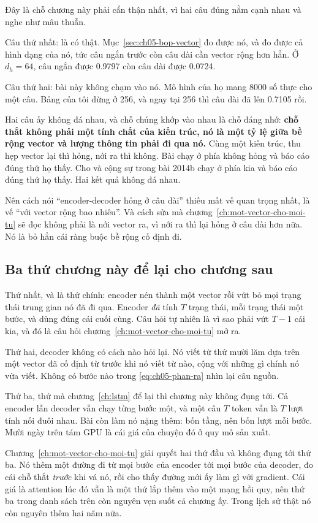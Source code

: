 %
Đây là chỗ chương này phải cẩn thận nhất, vì hai câu đúng nằm cạnh nhau và
nghe như mâu thuẫn.

Câu thứ nhất:  là có thật.
Mục~\ref{sec:ch05-bop-vector} đo được nó, và đo được cả hình dạng của nó, tức
câu ngắn  trước còn câu dài cần vector rộng hơn hẳn. Ở
\(d_h = 64\), câu
ngắn được 0.9797 còn câu dài được 0.0724.

Câu thứ hai: bài này không chạm vào nó. Mô hình của họ mang 8000 số thực cho một
câu. Bảng của tôi dừng ở 256, và ngay tại 256 thì câu dài đã lên 0.7105 rồi.

Hai câu ấy không đá nhau, và chỗ chúng khớp vào nhau là chỗ đáng nhớ:
\textbf{chỗ thắt không phải một tính chất của kiến trúc, nó là một tỷ lệ giữa bề
rộng vector và lượng thông tin phải đi qua nó.} Cùng một kiến trúc, thu hẹp
vector lại thì hỏng, nới ra thì không.
Bài chạy ở phía không hỏng và báo cáo đúng thứ họ thấy. Cho và cộng sự trong bài
2014b chạy ở phía kia và báo cáo đúng thứ họ thấy. Hai kết quả không đá nhau.

Nên cách nói \enquote{encoder-decoder hỏng ở câu dài} thiếu mất vế quan trọng
nhất, là vế \enquote{với vector rộng bao nhiêu}. Và cách sửa mà
chương~\ref{ch:mot-vector-cho-moi-tu} sẽ đọc không phải là nới vector ra, vì
nới ra thì lại hỏng ở câu dài hơn nữa. Nó là bỏ hẳn cái ràng buộc bề rộng cố
định đi.

\subsection*{Ba thứ chương này để lại cho chương sau}

%
Thứ nhất, và là thứ chính: encoder nén  thành
một vector rồi vứt bỏ
mọi trạng thái trung gian nó đã đi qua. Encoder \emph{đã} tính \(T\) trạng thái,
mỗi trạng thái một bước, và dùng đúng cái cuối cùng. Câu hỏi tự nhiên là vì sao
phải vứt \(T - 1\) cái kia, và đó là câu hỏi
chương~\ref{ch:mot-vector-cho-moi-tu} mở ra.

Thứ hai, decoder không có cách nào hỏi lại. Nó viết từ thứ mười lăm dựa trên một
vector đã cố định từ trước khi nó viết từ nào, cộng với những gì chính nó vừa
viết. Không có bước nào trong \eqref{eq:ch05-phan-ra} nhìn lại câu nguồn.

Thứ ba, thứ mà chương~\ref{ch:lstm} để lại thì chương này không đụng tới. Cả
encoder lẫn decoder vẫn chạy từng bước một, và một câu \(T\) token vẫn là \(T\)
lượt tính nối đuôi nhau. Bài còn làm nó nặng thêm: bốn tầng, nên bốn lượt mỗi
bước. Mười ngày trên tám GPU là cái giá của chuyện đó ở quy mô sản xuất.

Chương~\ref{ch:mot-vector-cho-moi-tu} giải quyết hai thứ đầu và không đụng tới
thứ ba. Nó thêm một đường đi từ mọi bước của encoder tới mọi bước của decoder,
đo cái chỗ
thắt \emph{trước} khi vá nó, rồi cho thấy đường mới ấy làm gì với gradient. Cái
giá là attention lúc đó vẫn là một thứ lắp thêm vào một mạng hồi quy, nên thứ
ba trong danh sách trên còn nguyên vẹn suốt cả chương ấy. Trong lịch sử thật nó
còn nguyên thêm hai năm nữa.
